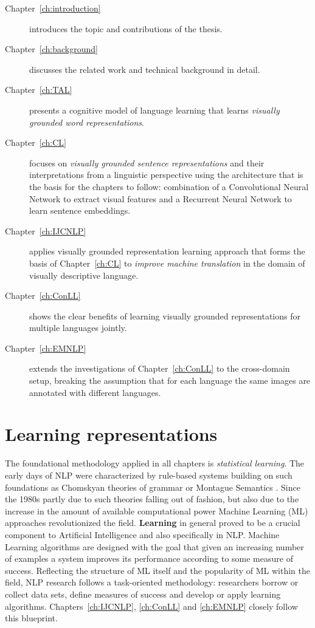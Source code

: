 \begin{description}
\item[Chapter~\ref{ch:introduction}] introduces the topic and contributions of
the thesis.

\item[Chapter~\ref{ch:background}] discusses the related work and technical background in detail.

\item[Chapter~\ref{ch:TAL}] presents
a cognitive model of language learning that learns \emph{visually grounded word representations}.

\item[Chapter~\ref{ch:CL} ] focuses on \emph{visually grounded sentence representations} and their
interpretations from a linguistic perspective using the architecture that is the basis
for the chapters to follow: combination of a Convolutional Neural Network to extract visual features and
a Recurrent Neural Network to learn sentence embeddings.

\item[Chapter~\ref{ch:IJCNLP}] applies visually grounded representation learning approach that forms the
basis of Chapter~\ref{ch:CL} to \emph{improve machine translation} in the domain of visually descriptive language.

\item[Chapter~\ref{ch:ConLL}] shows the clear benefits of learning visually grounded representations
for multiple languages jointly.

\item[Chapter~\ref{ch:EMNLP}] extends the investigations of Chapter~\ref{ch:ConLL} to the
cross-domain setup, breaking the assumption that for each language the same images are annotated
with different languages.
\end{description}



\section{Learning representations}
The foundational methodology applied in all chapters is \emph{statistical learning}.
The early days of NLP were characterized by rule-based systems building on such
foundations as Chomskyan theories of grammar \citep{chomsky2002syntactic} or 
Montague Semantics \citep{montague1970english}.
Since the 1980s partly due to such theories falling out of fashion, 
but also due to the increase in the amount
of available computational power Machine Learning (ML) approaches revolutionized
the field.  \textbf{Learning} in general proved to be a crucial component to Artificial Intelligence and also
specifically in NLP. Machine Learning algorithms are designed with the goal that given an increasing
number of examples a system improves its performance according to some measure of success.
Reflecting the structure of ML itself and the popularity of ML within the field, NLP research follows
a task-oriented methodology: researchers borrow or collect data sets, define measures of success and develop or
apply learning algorithms. Chapters~\ref{ch:IJCNLP}, \ref{ch:ConLL} and
\ref{ch:EMNLP}  closely follow this blueprint.

